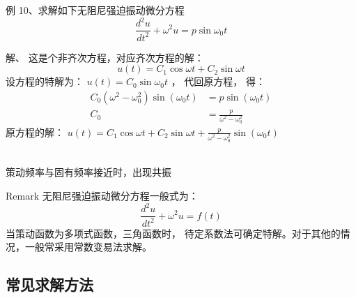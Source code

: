 \begin{frame}
	\begin{exampleblock} {例 10、求解如下无阻尼强迫振动微分方程}
	\begin{equation*}
		\frac{d^2 u}{d t^2} + \omega ^2 u = p  \sin \omega_0 t 
	\end{equation*}
	\end{exampleblock}
	\alert{解、} 
		这是个非齐次方程，对应齐次方程的解：\\
	\begin{equation*}
		u(t)=C_1 \cos \omega t +C_2 \sin \omega t 
	\end{equation*}
	设方程的特解为：
	$ u(t) =C_0 \sin \omega_0 t $ ，
	代回原方程， 得：
	\begin{align*}
		C_0(\omega^2-\omega_{0} ^2 ) \sin(\omega_0 t)& =p\sin(\omega_0 t)\\
		C_0 & = \frac{p}{\omega^2-\omega_{0} ^2 }
	\end{align*}
	原方程的解： $ u(t)= C_1 \cos \omega t +C_2 \sin \omega t+ \frac{p}{\omega^2-\omega_{0} ^2 } \sin (\omega_0 t) $ \\
\end{frame}

\begin{frame}
	 \\
	策动频率与固有频率接近时，出现共振
\end{frame}

\begin{frame}
	\begin{block} {Remark}
	无阻尼强迫振动微分方程一般式为：
	\begin{equation*}
		\frac{d^2 u}{d t^2} + \omega ^2 u = f(t)
	\end{equation*}
	当策动函数为多项式函数，三角函数时， 待定系数法可确定特解。对于其他的情况，一般常采用常数变易法求解。
	\end{block}
\end{frame}

\subsection{常见求解方法}

